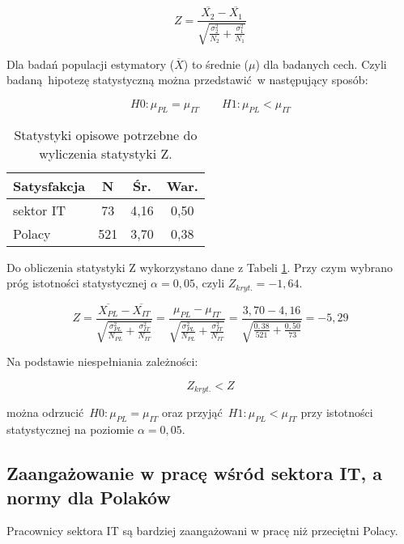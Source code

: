 \begin{equation}
  Z = \frac{\overline{X_2} - \overline{X_1}}{\sqrt{\frac{\sigma^2_2}{N_2}+\frac{\sigma^2_1}{N_1}}}
\end{equation}

Dla badań populacji estymatory ($\overline{X}$) to średnie ($\mu$) dla badanych cech. Czyli badaną hipotezę statystyczną można przedstawić w następujący sposób:

\begin{equation}
  H0: \mu_{PL} = \mu_{IT} \qquad H1: \mu_{PL} < \mu_{IT}
\end{equation}

\begin{table}[h!b]
  \begin{center}
    \begin{tabular}{l | c c c }
      Satysfakcja & N & Śr. & War. \\ \hline
      sektor IT & 73 & 4,16 & 0,50 \\
      Polacy & 521 & 3,70 & 0,38 \\
    \end{tabular}
  \end{center}
  \caption{Statystyki opisowe potrzebne do wyliczenia statystyki Z.}
  \label{tab:jss-norms-data}
\end{table}

Do obliczenia statystyki Z wykorzystano dane z Tabeli \ref{tab:jss-norms-data}. Przy czym wybrano próg istotności statystycznej $\alpha = 0,05$, czyli $Z_{kryt.} = -1,64$.

\begin{equation}
  Z = \frac{\overline{X_{PL}} - \overline{X_{IT}}}{\sqrt{\frac{\sigma^2_{PL}}{N_{PL}}+\frac{\sigma^2_{IT}}{N_{IT}}}} = \frac{\mu_{PL} - \mu_{IT}}{\sqrt{\frac{\sigma^2_{PL}}{N_{PL}}+\frac{\sigma^2_{IT}}{N_{IT}}}} = \frac{3,70 - 4,16}{\sqrt{\frac{0,38}{521}+\frac{0,50}{73}}} = -5,29 
\end{equation}

Na podstawie niespełniania zależności:

\begin{equation}
  Z_{kryt.} < Z
\end{equation}

można odrzucić $H0: \mu_{PL} = \mu_{IT}$ oraz przyjąć $H1: \mu_{PL} < \mu_{IT}$ przy istotności statystycznej na poziomie $\alpha = 0,05$.

\subsection{Zaangażowanie w pracę wśród sektora IT, a normy dla Polaków}
\begin{hyp}
  Pracownicy sektora IT są bardziej zaangażowani w pracę niż przeciętni Polacy.
  \label{hip:eng}
\end{hyp}

